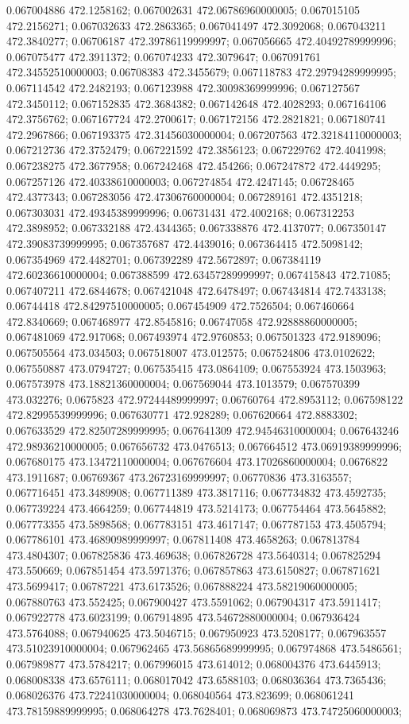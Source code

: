0.067004886 472.1258162; 0.067002631 472.06786960000005; 0.067015105 472.2156271; 0.067032633 472.2863365; 0.067041497 472.3092068; 0.067043211 472.3840277; 0.06706187 472.39786119999997; 0.067056665 472.40492789999996; 0.067075477 472.3911372; 0.067074233 472.3079647; 0.067091761 472.34552510000003; 0.06708383 472.3455679; 0.067118783 472.29794289999995; 0.067114542 472.2482193; 0.067123988 472.30098369999996; 0.067127567 472.3450112; 0.067152835 472.3684382; 0.067142648 472.4028293; 0.067164106 472.3756762; 0.067167724 472.2700617; 0.067172156 472.2821821; 0.067180741 472.2967866; 0.067193375 472.31456030000004; 0.067207563 472.32184110000003; 0.067212736 472.3752479; 0.067221592 472.3856123; 0.067229762 472.4041998; 0.067238275 472.3677958; 0.067242468 472.454266; 0.067247872 472.4449295; 0.067257126 472.40338610000003; 0.067274854 472.4247145; 0.06728465 472.4377343; 0.067283056 472.47306760000004; 0.067289161 472.4351218; 0.067303031 472.49345389999996; 0.06731431 472.4002168; 0.067312253 472.3898952; 0.067332188 472.4344365; 0.067338876 472.4137077; 0.067350147 472.39083739999995; 0.067357687 472.4439016; 0.067364415 472.5098142; 0.067354969 472.4482701; 0.067392289 472.5672897; 0.067384119 472.60236610000004; 0.067388599 472.63457289999997; 0.067415843 472.71085; 0.067407211 472.6844678; 0.067421048 472.6478497; 0.067434814 472.7433138; 0.06744418 472.84297510000005; 0.067454909 472.7526504; 0.067460664 472.8340669; 0.067468977 472.8545816; 0.06747058 472.92888860000005; 0.067481069 472.917068; 0.067493974 472.9760853; 0.067501323 472.9189096; 0.067505564 473.034503; 0.067518007 473.012575; 0.067524806 473.0102622; 0.067550887 473.0794727; 0.067535415 473.0864109; 0.067553924 473.1503963; 0.067573978 473.18821360000004; 0.067569044 473.1013579; 0.067570399 473.032276; 0.0675823 472.97244489999997; 0.06760764 472.8953112; 0.067598122 472.82995539999996; 0.067630771 472.928289; 0.067620664 472.8883302; 0.067633529 472.82507289999995; 0.067641309 472.94546310000004; 0.067643246 472.98936210000005; 0.067656732 473.0476513; 0.067664512 473.06919389999996; 0.067680175 473.13472110000004; 0.067676604 473.17026860000004; 0.0676822 473.1911687; 0.06769367 473.26723169999997; 0.06770836 473.3163557; 0.067716451 473.3489908; 0.067711389 473.3817116; 0.067734832 473.4592735; 0.067739224 473.4664259; 0.067744819 473.5214173; 0.067754464 473.5645882; 0.067773355 473.5898568; 0.067783151 473.4617147; 0.067787153 473.4505794; 0.067786101 473.46890989999997; 0.067811408 473.4658263; 0.067813784 473.4804307; 0.067825836 473.469638; 0.067826728 473.5640314; 0.067825294 473.550669; 0.067851454 473.5971376; 0.067857863 473.6150827; 0.067871621 473.5699417; 0.06787221 473.6173526; 0.067888224 473.58219060000005; 0.067880763 473.552425; 0.067900427 473.5591062; 0.067904317 473.5911417; 0.067922778 473.6023199; 0.067914895 473.54672880000004; 0.067936424 473.5764088; 0.067940625 473.5046715; 0.067950923 473.5208177; 0.067963557 473.51023910000004; 0.067962465 473.56865689999995; 0.067974868 473.5486561; 0.067989877 473.5784217; 0.067996015 473.614012; 0.068004376 473.6445913; 0.068008338 473.6576111; 0.068017042 473.6588103; 0.068036364 473.7365436; 0.068026376 473.72241030000004; 0.068040564 473.823699; 0.068061241 473.78159889999995; 0.068064278 473.7628401; 0.068069873 473.74725060000003; 